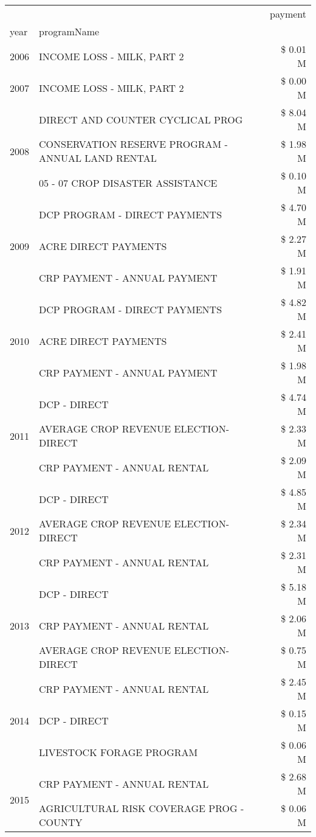 \begin{tabular}{llr}
\toprule
 &  & payment \\
year & programName &  \\
\midrule
2006 & INCOME LOSS - MILK, PART 2 & \$ 0.01 M \\
\cline{1-3}
2007 & INCOME LOSS - MILK, PART 2 & \$ 0.00 M \\
\cline{1-3}
\multirow[t]{3}{*}{2008} & DIRECT AND COUNTER CYCLICAL PROG & \$ 8.04 M \\
 & CONSERVATION RESERVE PROGRAM - ANNUAL LAND RENTAL & \$ 1.98 M \\
 & 05 - 07 CROP DISASTER ASSISTANCE & \$ 0.10 M \\
\cline{1-3}
\multirow[t]{3}{*}{2009} & DCP PROGRAM - DIRECT PAYMENTS & \$ 4.70 M \\
 & ACRE DIRECT PAYMENTS & \$ 2.27 M \\
 & CRP PAYMENT - ANNUAL PAYMENT & \$ 1.91 M \\
\cline{1-3}
\multirow[t]{3}{*}{2010} & DCP PROGRAM - DIRECT PAYMENTS & \$ 4.82 M \\
 & ACRE DIRECT PAYMENTS & \$ 2.41 M \\
 & CRP PAYMENT - ANNUAL PAYMENT & \$ 1.98 M \\
\cline{1-3}
\multirow[t]{3}{*}{2011} & DCP - DIRECT & \$ 4.74 M \\
 & AVERAGE CROP REVENUE ELECTION-DIRECT & \$ 2.33 M \\
 & CRP PAYMENT - ANNUAL RENTAL & \$ 2.09 M \\
\cline{1-3}
\multirow[t]{3}{*}{2012} & DCP - DIRECT & \$ 4.85 M \\
 & AVERAGE CROP REVENUE ELECTION-DIRECT & \$ 2.34 M \\
 & CRP PAYMENT - ANNUAL RENTAL & \$ 2.31 M \\
\cline{1-3}
\multirow[t]{3}{*}{2013} & DCP - DIRECT & \$ 5.18 M \\
 & CRP PAYMENT - ANNUAL RENTAL & \$ 2.06 M \\
 & AVERAGE CROP REVENUE ELECTION-DIRECT & \$ 0.75 M \\
\cline{1-3}
\multirow[t]{3}{*}{2014} & CRP PAYMENT - ANNUAL RENTAL & \$ 2.45 M \\
 & DCP - DIRECT & \$ 0.15 M \\
 & LIVESTOCK FORAGE PROGRAM & \$ 0.06 M \\
\cline{1-3}
\multirow[t]{3}{*}{2015} & CRP PAYMENT - ANNUAL RENTAL & \$ 2.68 M \\
 & AGRICULTURAL RISK COVERAGE PROG - COUNTY & \$ 0.06 M \\

\end{tabular}
